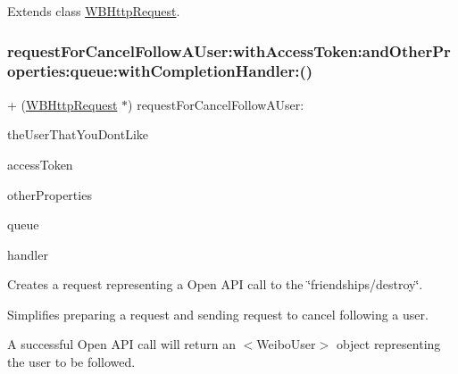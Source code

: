 Extends class \mbox{\hyperlink{interface_w_b_http_request_a8266e8e1c5230407f29ee63e05e98b38}{W\+B\+Http\+Request}}.

\mbox{\label{category_w_b_http_request_07_weibo_user_08_a0a601918d65f1776f99882facc1349e3}} 
\subsubsection{\texorpdfstring{request\+For\+Cancel\+Follow\+A\+User\+:with\+Access\+Token\+:and\+Other\+Properties\+:queue\+:with\+Completion\+Handler\+:()}{requestForCancelFollowAUser:withAccessToken:andOtherProperties:queue:withCompletionHandler:()}\hspace{0.1cm}{\footnotesize\ttfamily [1/3]}}
{\footnotesize\ttfamily + (\mbox{\hyperlink{interface_w_b_http_request}{W\+B\+Http\+Request}} $\ast$) request\+For\+Cancel\+Follow\+A\+User\+: \begin{DoxyParamCaption}\item[{(N\+S\+String $\ast$)}]{the\+User\+That\+You\+Dont\+Like }\item[{withAccessToken:(N\+S\+String $\ast$)}]{access\+Token }\item[{andOtherProperties:(N\+S\+Dictionary $\ast$)}]{other\+Properties }\item[{queue:(N\+S\+Operation\+Queue $\ast$)}]{queue }\item[{withCompletionHandler:(W\+B\+Request\+Handler)}]{handler }\end{DoxyParamCaption}}

Creates a request representing a Open A\+PI call to the \char`\"{}friendships/destroy\char`\"{}.

Simplifies preparing a request and sending request to cancel following a user.

A successful Open A\+PI call will return an $<$\+Weibo\+User$>$ object representing the user to be followed.

